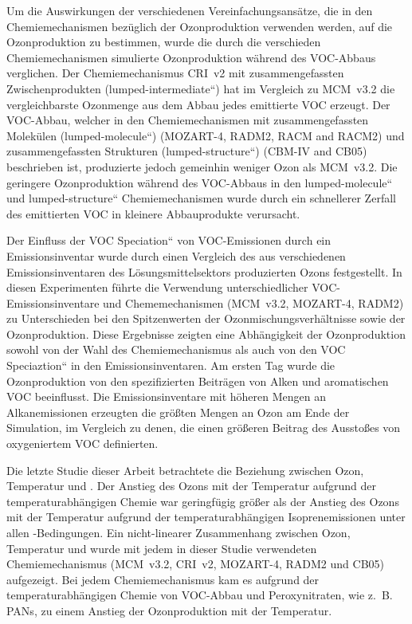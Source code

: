 Um die Auswirkungen der verschiedenen Vereinfachungsansätze, die in den Chemiemechanismen bezüglich der Ozonproduktion verwenden werden, auf die Ozonproduktion zu bestimmen, wurde die durch die verschieden Chemiemechanismen simulierte Ozonproduktion während des VOC-Abbaus verglichen.
Der Chemiemechanismus CRI~v2 mit zusammengefassten Zwischenprodukten (\quotedblbase lumped-intermediate``) hat im Vergleich zu  MCM~v3.2 die vergleichbarste Ozonmenge aus dem Abbau jedes emittierte VOC erzeugt. 
Der VOC-Abbau, welcher in den Chemiemechanismen mit zusammengefassten Molekülen (\quotedblbase lumped-molecule``) (MOZART-4, RADM2, RACM and RACM2) und zusammengefassten Strukturen (\quotedblbase lumped-structure``) (CBM-IV and CB05) beschrieben ist, produzierte jedoch gemeinhin weniger Ozon als MCM~v3.2. 
Die geringere Ozonproduktion während des VOC-Abbaus in den \quotedblbase lumped-molecule`` und \quotedblbase lumped-structure`` Chemiemechanismen wurde durch ein schnellerer Zerfall des emittierten VOC in kleinere Abbauprodukte verursacht.

Der Einfluss der \quotedblbase VOC Speciation`` von VOC-Emissionen durch ein Emissionsinventar wurde durch einen Vergleich des aus verschiedenen Emissionsinventaren des Lösungsmittelsektors produzierten Ozons festgestellt.
In diesen Experimenten führte die Verwendung unterschiedlicher VOC-Emissionsinventare und Chememechanismen (MCM~v3.2, MOZART-4, RADM2) zu Unterschieden bei den Spitzenwerten der Ozonmischungsverhältnisse sowie der Ozonproduktion.
Diese Ergebnisse zeigten eine Abhängigkeit der Ozonproduktion sowohl von der Wahl des Chemiemechanismus als auch von den \quotedblbase VOC Speciaztion`` in den Emissionsinventaren.
Am ersten Tag wurde die Ozonproduktion von den spezifizierten Beiträgen von Alken und aromatischen VOC beeinflusst.
Die Emissionsinventare mit höheren Mengen an Alkanemissionen erzeugten die größten Mengen an Ozon am Ende der Simulation, im Vergleich zu denen, die einen größeren Beitrag des Ausstoßes von oxygeniertem VOC definierten.

Die letzte Studie dieser Arbeit betrachtete die Beziehung zwischen Ozon, Temperatur und .
Der Anstieg des Ozons mit der Temperatur aufgrund der temperaturabhängigen Chemie war geringfügig größer als der Anstieg des Ozons mit der Temperatur aufgrund der temperaturabhängigen Isoprenemissionen unter allen -Bedingungen.
Ein nicht-linearer Zusammenhang zwischen Ozon, Temperatur und  wurde mit jedem in dieser Studie verwendeten Chemiemechanismus (MCM~v3.2, CRI~v2, MOZART-4, RADM2 und CB05) aufgezeigt.
Bei jedem Chemiemechanismus kam es aufgrund der temperaturabhängigen Chemie von VOC-Abbau und Peroxynitraten, wie z.~B. PANs, zu einem Anstieg der Ozonproduktion mit der Temperatur. 

